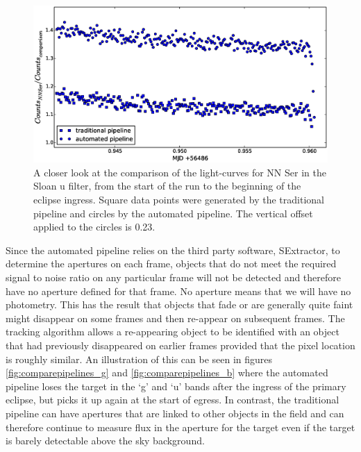 \begin{figure}
\centering
\includegraphics[width=140mm]{images/nn_ser_compare_zoom_b.eps}
\caption{A closer look at the comparison of the light-curves for NN Ser in the Sloan u filter, from the start of the run to the beginning of the eclipse ingress. Square data points were generated by the traditional pipeline and circles by the automated pipeline. The vertical offset applied to the circles is 0.23. }
\label{fig:comparepipelines_zoom_b}
\end{figure}

Since the automated pipeline relies on the third party software, SExtractor, to determine the apertures on each frame, objects that do not meet the required signal to noise ratio on any particular frame will not be detected and therefore have no aperture defined for that frame. No aperture means that we will have no photometry. This has the result that objects that fade or are generally quite faint might disappear on some frames and then re-appear on subsequent frames. The tracking algorithm allows a re-appearing object to be identified with an object that had previously disappeared on earlier frames provided that the pixel location is roughly similar. An illustration of this can be seen in figures \ref{fig:comparepipelines_g} and \ref{fig:comparepipelines_b} where the automated pipeline loses the target in the `g' and `u' bands after the ingress of the primary eclipse, but picks it up again at the start of egress. In contrast, the traditional pipeline can have apertures that are linked to other objects in the field and can therefore continue to measure flux in the aperture for the target even if the target is barely detectable above the sky background.

